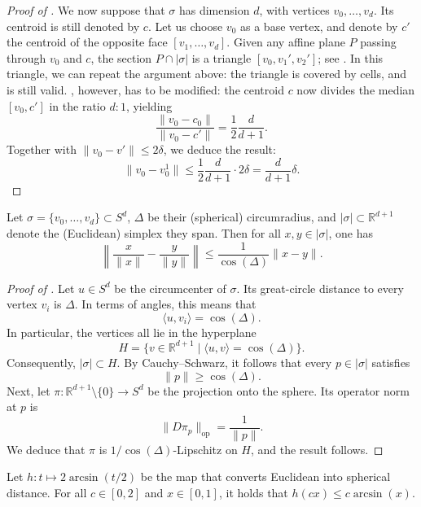 \documentclass[a4paper,english,cleveref,autoref,thm-restate,nolineno]{socg-lipics-v2021}
\newcommand{\R}{\mathbb R}
\newcommand{\geomreal}[1] { |#1| } %
\begin{document}
\begin{proof}[Proof of ]
	We now suppose that $\sigma$ has dimension $d$, with vertices $v_0,\dots,v_d$.
	Its centroid is still denoted by $c$.
	Let us choose $v_0$ as a base vertex, and denote by $c'$ the centroid of the opposite face $[v_1,\dots,v_d]$.
	Given any affine plane $P$ passing through $v_0$ and $c$, the section $P\cap\geomreal{\sigma}$ is a triangle $[v_0,v_1',v_2']$; see .
	In this triangle, we can repeat the argument above: the triangle is covered by cells, and  is still valid.
	, however, has to be modified: the centroid $c$ now divides the median $[v_0,c']$ in the ratio $d:1$, yielding
	\[
	\frac{\|v_0-c_0\|}{\|v_0-c'\|} = \frac{1}{2}\frac{d}{d+1}.
	\]
	Together with $\|v_0-v'\|\leq 2\delta$, we deduce the result:	
	\[
	\|v_0-v_0^1\| \leq \frac{1}{2}\frac{d}{d+1} \cdot 2\delta = \frac{d}{d+1}\delta.
	\]
\end{proof}

\begin{lemma}\label{lem:spherical_distorsion_distances}
	Let $\sigma=\{v_0,\dots,v_{d}\}\subset S^d$, $\Delta$ be their (spherical) circumradius, and $\geomreal{\sigma}\subset \R^{d+1}$ denote the (Euclidean) simplex they span.
	Then for all $x,y \in \geomreal{\sigma}$, one has
	\[
	\left\|\frac{x}{\|x\|}-\frac{y}{\|y\|} \right\|
	\leq
	\frac{1}{\cos(\Delta)} \|x-y\|.
	\]
\end{lemma}

\begin{proof}[Proof of ]
	Let $u\in S^d$ be the circumcenter of $\sigma$.
	Its great-circle distance to every vertex $v_i$ is $\Delta$.
	In terms of angles, this means that 
	\[
	\langle u, v_i \rangle = \cos(\Delta).
	\]
	In particular, the vertices all lie in the hyperplane
	\[
	H = \{v \in \R^{d+1} \mid \langle u, v \rangle = \cos(\Delta)\}.
	\]
	Consequently, $\geomreal{\sigma}\subset H$.
	By Cauchy–Schwarz, it follows that every $p\in \geomreal{\sigma}$ satisfies
	\[
	\|p\|\geq \cos(\Delta).
	\]	
	Next, let $\pi\colon \R^{d+1}\setminus\{0\} \to S^d$ be the projection onto the sphere.
	Its operator norm at $p$ is
	\[
	\|D \pi_p\|_\mathrm{op} = \frac{1}{\|p\|}.
	\]
	We deduce that $\pi$ is $1/\cos(\Delta)$-Lipschitz on $H$, and the result follows.
\end{proof}

\begin{lemma}\label{lem:spherical_convexity}
	Let $h\colon t \mapsto 2\arcsin(t/2)$ be the map that converts Euclidean into spherical distance.
	For all $c \in [0,2]$ and $x\in[0,1]$, it holds that $h(cx)\leq c\arcsin(x)$.
\end{lemma}
\end{document}
